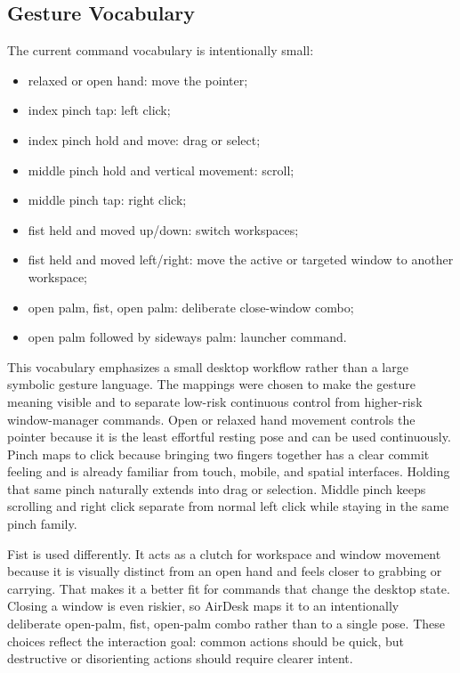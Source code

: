 \documentclass[manuscript]{acmart}
\begin{document}
\subsection{Gesture Vocabulary}

The current command vocabulary is intentionally small:

\begin{itemize}
  \item relaxed or open hand: move the pointer;
  \item index pinch tap: left click;
  \item index pinch hold and move: drag or select;
  \item middle pinch hold and vertical movement: scroll;
  \item middle pinch tap: right click;
  \item fist held and moved up/down: switch workspaces;
  \item fist held and moved left/right: move the active or targeted window to another workspace;
  \item open palm, fist, open palm: deliberate close-window combo;
  \item open palm followed by sideways palm: launcher command.
\end{itemize}

This vocabulary emphasizes a small desktop workflow rather than a large symbolic gesture language. The mappings were chosen to make the gesture meaning visible and to separate low-risk continuous control from higher-risk window-manager commands. Open or relaxed hand movement controls the pointer because it is the least effortful resting pose and can be used continuously. Pinch maps to click because bringing two fingers together has a clear commit feeling and is already familiar from touch, mobile, and spatial interfaces. Holding that same pinch naturally extends into drag or selection. Middle pinch keeps scrolling and right click separate from normal left click while staying in the same pinch family.

Fist is used differently. It acts as a clutch for workspace and window movement because it is visually distinct from an open hand and feels closer to grabbing or carrying. That makes it a better fit for commands that change the desktop state. Closing a window is even riskier, so AirDesk maps it to an intentionally deliberate open-palm, fist, open-palm combo rather than to a single pose. These choices reflect the interaction goal: common actions should be quick, but destructive or disorienting actions should require clearer intent.
\end{document}
